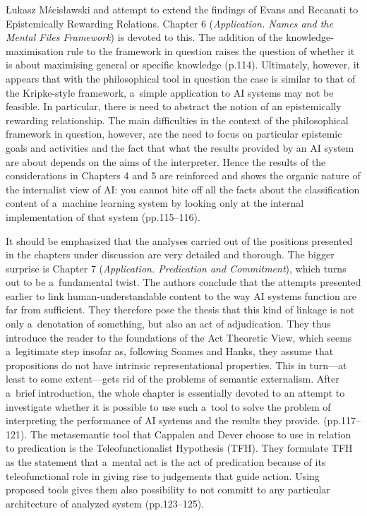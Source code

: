 \begin{newrevengenv}{Łukasz Mścisławski}
{} and attempt to extend the findings of Evans and Recanati to Epistemically Rewarding Relations. Chapter 6 (\textit{Application. Names and the Mental Files Framework}) is devoted to this. The addition of the knowledge-maximisation rule to the framework in question raises the question of whether it is about maximising general or specific knowledge (p.114). Ultimately, however, it appears that with the philosophical tool in question the case is similar to that of the Kripke-style framework, a~simple application to AI systems may not be feasible. In particular, there is need to abstract the notion of an epistemically rewarding relationship. The main difficulties in the context of the philosophical framework in question, however, are the need to focus on particular epistemic goals and activities and the fact that what the results provided by an AI system are about depends on the aims of the interpreter. Hence the results of the considerations in Chapters 4 and 5 are reinforced and shows the organic nature of the internalist view of AI: you cannot bite off all the facts about the classification content of a~machine learning system by looking only at the internal implementation of that system (pp.115--116).

It should be emphasized that the analyses carried out of the positions presented in the chapters under discussion are very detailed and thorough. The bigger surprise is Chapter 7 (\textit{Application. Predication and Commitment}), which turns out to be a~fundamental twist. The authors conclude that the attempts presented earlier to link human-understandable content to the way AI systems function are far from sufficient. They therefore pose the thesis that this kind of linkage is not only a~denotation of something, but also an act of adjudication. They thus introduce the reader to the foundations of the Act Theoretic View, which seems a~legitimate step insofar as, following Soames and Hanks, they assume that propositions do not have intrinsic representational properties. This in turn---at least to some extent---gets rid of the problems of semantic externalism. After a~brief introduction, the whole chapter is essentially devoted to an attempt to investigate whether it is possible to use such a~tool to solve the problem of interpreting the performance of AI systems and the results they provide. (pp.117--121). The metasemantic tool that Cappalen and Dever choose to use in relation to predication is the Teleofunctionalist Hypothesis (TFH). They formulate TFH as the statement that a~mental act is the act of predication because of its teleofunctional role in giving rise to judgements that guide action. Using proposed tools gives them also possibility to not committ to any particular architecture of analyzed system (pp.123--125).


\end{newrevengenv}
